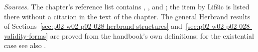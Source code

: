 \emph{Sources.}  The chapter's reference list \cite[p.~912]{Statman1977}
contains \cite{KreiselKrivine1967}, \cite{KreiselTait1961},
\cite{Lifsic1968} and \cite{Statman1974}; the item by Lif\v{s}ic is listed
there without a citation in the text of the chapter.  The general Herbrand
results of Sections~\ref{sec:p02-w02-p02-028-herbrand-structures}
and~\ref{sec:p02-w02-p02-028-validity-forms} are proved from the handbook's own
definitions; for the existential case see also
\cite[Theorem~2.9, p.~876]{Schwichtenberg1977}.
